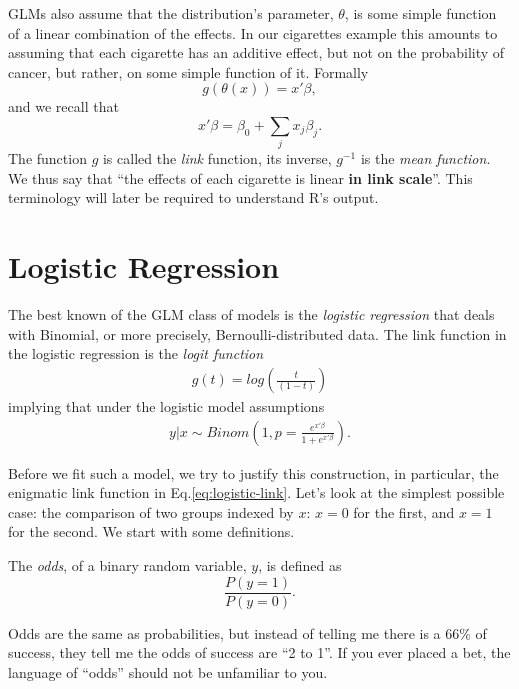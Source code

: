 \documentclass[]{book}
\theoremstyle{definition}
\theoremstyle{definition}
\theoremstyle{definition}
\theoremstyle{remark}
\let\BeginKnitrBlock\begin \let\EndKnitrBlock\end
\begin{document}
GLMs also assume that the distribution's parameter, \(\theta\), is some simple function of a linear combination of the effects.
In our cigarettes example this amounts to assuming that each cigarette has an additive effect, but not on the probability of cancer, but rather, on some simple function of it.
Formally
\[g(\theta(x))=x'\beta,\] and we recall that \[x'\beta=\beta_0 + \sum_j x_j \beta_j.\]
The function \(g\) is called the \emph{link} function, its inverse, \(g^{-1}\) is the \emph{mean function}.
We thus say that ``the effects of each cigarette is linear \textbf{in link scale}''.
This terminology will later be required to understand R's output.

\hypertarget{logistic-regression}{%
\section{Logistic Regression}\label{logistic-regression}}

The best known of the GLM class of models is the \emph{logistic regression} that deals with Binomial, or more precisely, Bernoulli-distributed data.
The link function in the logistic regression is the \emph{logit function}
\begin{align}
  g(t)=log\left( \frac{t}{(1-t)} \right)
  \label{eq:logistic-link}  
\end{align}
implying that under the logistic model assumptions
\begin{align}
  y|x \sim Binom \left( 1, p=\frac{e^{x'\beta}}{1+e^{x'\beta}} \right).
  \label{eq:logistic}
\end{align}

Before we fit such a model, we try to justify this construction, in particular, the enigmatic link function in Eq.\eqref{eq:logistic-link}.
Let's look at the simplest possible case: the comparison of two groups indexed by \(x\): \(x=0\) for the first, and \(x=1\) for the second.
We start with some definitions.

\BeginKnitrBlock{definition}[Odds]
\protect\hypertarget{def:unnamed-chunk-182}{}{\label{def:unnamed-chunk-182} {} }The \emph{odds}, of a binary random variable, \(y\), is defined as \[\frac{P(y=1)}{P(y=0)}.\]
\EndKnitrBlock{definition}

Odds are the same as probabilities, but instead of telling me there is a \(66\%\) of success, they tell me the odds of success are ``2 to 1''.
If you ever placed a bet, the language of ``odds'' should not be unfamiliar to you.
\end{document}
